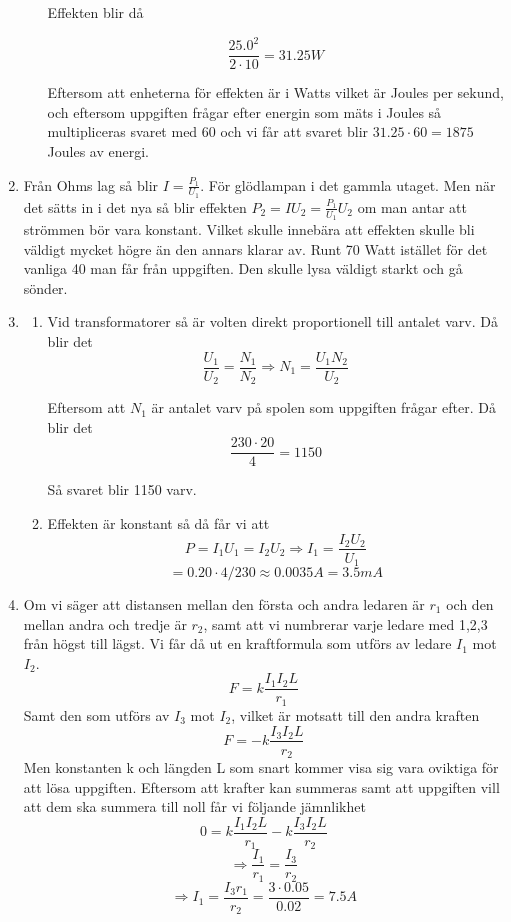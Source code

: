 \documentclass[a4paper,12pt]{article}
\begin{document}
\begin{enumerate}
\begin{enumerate}
                        Effekten blir då

                        $$\frac{25.0^2}{2\cdot 10}=31.25W$$

                        Eftersom att enheterna för effekten är i Watts vilket är Joules per sekund,
                        och eftersom uppgiften frågar efter energin som mäts i Joules så
                        multipliceras svaret med 60 och vi får att svaret blir $31.25\cdot 60=1 875$ Joules av energi.
            \end{enumerate}

      \item Från Ohms lag så blir $I=\frac{P_1}{U_1}$. För glödlampan i det gammla utaget.
            Men när det sätts in i det nya så blir effekten $P_2=IU_2=\frac{P_1}{U_1}U_2$ om man
            antar att strömmen bör vara konstant.
            Vilket skulle innebära att effekten skulle bli väldigt mycket högre än den annars klarar
            av. Runt 70 Watt istället för det vanliga 40 man får från uppgiften. Den skulle lysa
            väldigt starkt och gå sönder.

      \item
            \begin{enumerate}
                  \item
                        Vid transformatorer så är volten direkt proportionell till antalet varv.
                        Då blir det $$\frac{U_1}{U_2}=\frac{N_1}{N_2}\Rightarrow N_1=\frac{U_1N_2}{U_2}$$

                        Eftersom att $N_1$ är antalet varv på spolen som uppgiften frågar efter.
                        Då blir det
                        $$\frac{230\cdot 20}{4}=1150$$

                        Så svaret blir 1150 varv.
                  \item Effekten är konstant så då får vi att $$P=I_1U_1=I_2U_2\Rightarrow I_1=\frac{I_2U_2}{U_1}$$
                        $$=0.20\cdot 4 / 230 \approx 0.0035A=3.5mA$$
            \end{enumerate}

      \item Om vi säger att distansen mellan den första och andra ledaren är $r_1$ och
            den mellan andra och tredje är $r_2$, samt att vi numbrerar varje ledare
            med 1,2,3 från högst till lägst. Vi får då ut en kraftformula som utförs
            av ledare $I_1$ mot $I_2$.
            $$F=k\frac{I_1I_2L}{r_1}$$
            Samt den som utförs av $I_3$ mot $I_2$, vilket är motsatt till den andra kraften
            $$F=-k\frac{I_3I_2L}{r_2}$$
            Men konstanten k och längden L som snart kommer visa sig vara oviktiga för att lösa uppgiften.
            Eftersom att krafter kan summeras samt att uppgiften vill att dem ska summera
            till noll får vi följande jämnlikhet
            $$0=k\frac{I_1I_2L}{r_1}-k\frac{I_3I_2L}{r_2}$$
            $$\Rightarrow\frac{I_1}{r_1}=\frac{I_3}{r_2}$$
            $$\Rightarrow I_1 = \frac{I_3r_1}{r_2}=\frac{3\cdot 0.05}{0.02}=7.5A$$


\end{enumerate}
\end{document}
